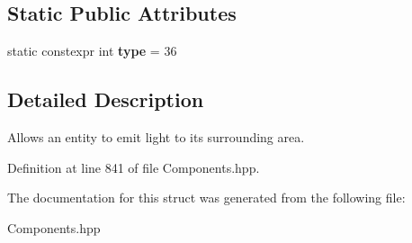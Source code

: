 \subsection*{Static Public Attributes}
\begin{DoxyCompactItemize}
\item 
static constexpr int {\bfseries type} = 36\hypertarget{struct_light_component_ab5bbdfb4bf129d19b7e4aa942dfb264b}{}\label{struct_light_component_ab5bbdfb4bf129d19b7e4aa942dfb264b}

\end{DoxyCompactItemize}


\subsection{Detailed Description}
Allows an entity to emit light to it\textquotesingle{}s surrounding area. 

Definition at line 841 of file Components.\+hpp.



The documentation for this struct was generated from the following file\+:\begin{DoxyCompactItemize}
\item 
Components.\+hpp\end{DoxyCompactItemize}
